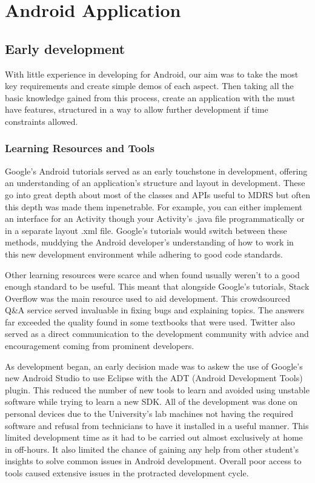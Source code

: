 \documentclass{l3proj}
\begin{document}

\section{Android Application}

\subsection{Early development} With little experience in developing for Android,
our aim was to take the most key requirements and create simple demos of each
aspect. Then taking all the basic knowledge gained from this process, create an
application with the must have features, structured in a way to allow further development if time constraints allowed.

\subsubsection{Learning Resources and Tools} Google's Android tutorials served
as an early touchstone in development, offering an understanding of an
application's structure and layout in development. These go into great depth
about most of the classes and APIs useful to MDRS but often this depth was made
them inpenetrable. For example, you can either implement an interface for an
Activity though your Activity's .java file programmatically or in a separate
layout .xml file. Google's tutorials would switch between these methods,
muddying the Android developer's understanding of how to work in this new
development environment while adhering to good code standards.

Other learning resources were scarce and when found usually weren't to a good
enough standard to be useful. This meant that alongside Google's tutorials,
Stack Overflow was the main resource used to aid development. This crowdsourced
Q&A service served invaluable in fixing bugs and explaining topics. The answers
far exceeded the quality found in some textbooks that were used. Twitter also served as a direct communication to the development community with advice and encouragement coming from prominent developers.

As development began, an early decision made was to askew the use of Google's
new Android Studio to use Eclipse with the ADT (Android Development Tools)
plugin. This reduced the number of new tools to learn and avoided using unstable
software while trying to learn a new SDK. All of the development was done on
personal devices due to the University's lab machines not having the required
software and refusal from technicians to have it installed in a useful manner.
This limited development time as it had to be carried out almost exclusively at
home in off-hours. It also limited the chance of gaining any help from other
student's insights to solve common issues in Android development. Overall poor
access to tools caused extensive issues in the protracted  development cycle.
\end{document}
